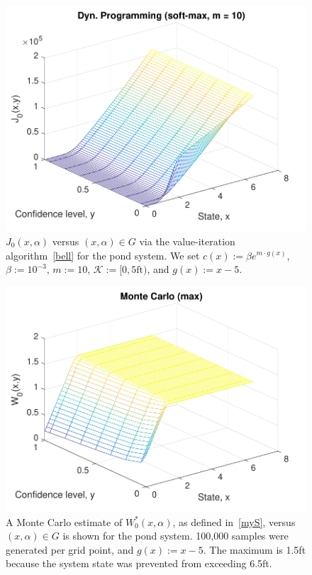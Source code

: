\documentclass[letterpaper, 10 pt, conference]{ieeeconf}  %
\begin{document}
\begin{figure}[thpb]
      \centering
      \includegraphics[scale=0.5]{dyn_prog_J0_sept112018.pdf}
      \caption{$J_0(x,\alpha)$ versus $(x, \alpha) \in G$ via the value-iteration algorithm~\eqref{bell} for the pond system.
	  We set $c(x) := \beta e^{m\cdot g(x)}$, $\beta := 10^{-3}$, $m := 10$, $\mathcal{K} := [0, 5\text{ft})$, and $g(x) := x-5$.}
      \label{J0dp}
\end{figure}

\begin{figure}[thpb]
      \centering
      \includegraphics[scale=0.5]{monte_carlo_max_sept112018.pdf}
      \caption{A Monte Carlo estimate of $W_0^*(x,\alpha)$, as defined in~\eqref{myS}, versus $(x, \alpha) \in G$ is shown for the pond system.
	  100,000 samples were generated per grid point, and $g(x) := x - 5$. 
	  The maximum is 1.5ft because the system state was prevented from exceeding 6.5ft.}
      \label{W0mc}
\end{figure}
\end{document}
